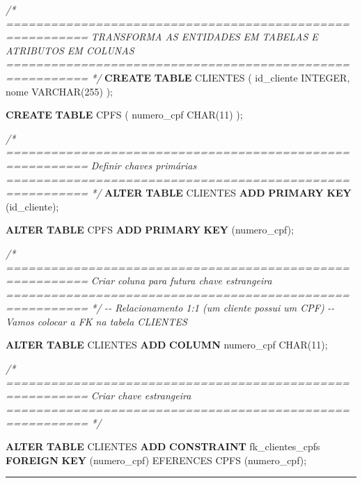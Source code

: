 \documentclass[
]{book}
\newenvironment{Shaded}{\begin{snugshade}}{\end{snugshade}}
\newcommand{\CommentTok}[1]{\textcolor[rgb]{0.56,0.35,0.01}{\textit{#1}}}
\newcommand{\DataTypeTok}[1]{\textcolor[rgb]{0.13,0.29,0.53}{#1}}
\newcommand{\DecValTok}[1]{\textcolor[rgb]{0.00,0.00,0.81}{#1}}
\newcommand{\KeywordTok}[1]{\textcolor[rgb]{0.13,0.29,0.53}{\textbf{#1}}}
\newcommand{\NormalTok}[1]{#1}
\begin{document}
\begin{Shaded}
\begin{Highlighting}[]
\CommentTok{/* =========================================================}
\CommentTok{   TRANSFORMA AS ENTIDADES EM TABELAS E ATRIBUTOS EM COLUNAS}
\CommentTok{   ========================================================= */}
\KeywordTok{CREATE} \KeywordTok{TABLE}\NormalTok{ CLIENTES }
\NormalTok{(}
\NormalTok{    id\_cliente }\DataTypeTok{INTEGER}\NormalTok{,}
\NormalTok{    nome }\DataTypeTok{VARCHAR}\NormalTok{(}\DecValTok{255}\NormalTok{)}
\NormalTok{);}

\KeywordTok{CREATE} \KeywordTok{TABLE}\NormalTok{ CPFS}
\NormalTok{(}
\NormalTok{    numero\_cpf }\DataTypeTok{CHAR}\NormalTok{(}\DecValTok{11}\NormalTok{)}
\NormalTok{);}

\CommentTok{/* =========================================================}
\CommentTok{   Definir chaves primárias}
\CommentTok{   ========================================================= */}
\KeywordTok{ALTER} \KeywordTok{TABLE}\NormalTok{ CLIENTES }\KeywordTok{ADD} \KeywordTok{PRIMARY} \KeywordTok{KEY}\NormalTok{ (id\_cliente);}

\KeywordTok{ALTER} \KeywordTok{TABLE}\NormalTok{ CPFS }\KeywordTok{ADD} \KeywordTok{PRIMARY} \KeywordTok{KEY}\NormalTok{ (numero\_cpf);}

\CommentTok{/* =========================================================}
\CommentTok{    Criar coluna para futura chave estrangeira}
\CommentTok{   ========================================================= */}
\CommentTok{{-}{-} Relacionamento 1:1 (um cliente possui um CPF)}
\CommentTok{{-}{-} Vamos colocar a FK na tabela CLIENTES}

\KeywordTok{ALTER} \KeywordTok{TABLE}\NormalTok{ CLIENTES   }\KeywordTok{ADD} \KeywordTok{COLUMN}\NormalTok{ numero\_cpf }\DataTypeTok{CHAR}\NormalTok{(}\DecValTok{11}\NormalTok{);}

\CommentTok{/* =========================================================}
\CommentTok{    Criar chave estrangeira}
\CommentTok{   ========================================================= */}

\KeywordTok{ALTER} \KeywordTok{TABLE}\NormalTok{ CLIENTES }\KeywordTok{ADD} \KeywordTok{CONSTRAINT}\NormalTok{ fk\_clientes\_cpfs }\KeywordTok{FOREIGN} \KeywordTok{KEY}\NormalTok{ (numero\_cpf) EFERENCES CPFS (numero\_cpf);}
\end{Highlighting}
\end{Shaded}

\begin{center}\rule{0.5\linewidth}{0.5pt}\end{center}
\end{document}

